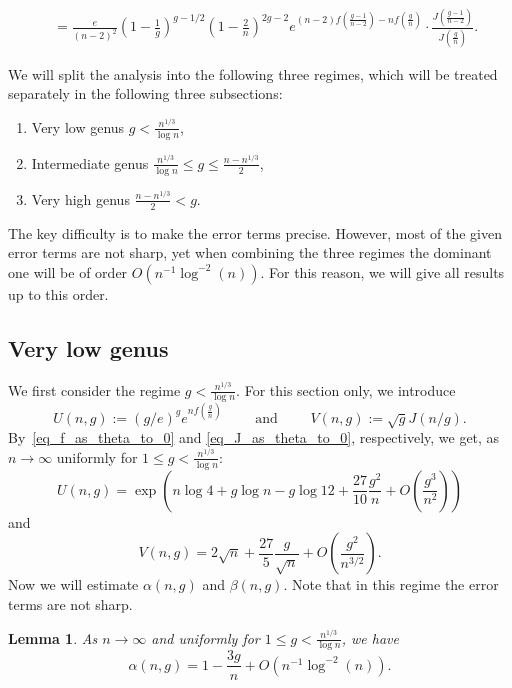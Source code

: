 \documentclass[a4paper,12pt]{article}
\newtheorem{lemma}[theorem]{Lemma}
\theoremstyle{definition}
\newcommand{\nto}{\ensuremath{n\rightarrow\infty}}
\newcommand{\bigO}[1]{O\left({#1}\right)}
\newcommand{\err}{\bigO{n^{-1}\log^{-2}(n)}}
\newcommand{\bigpar}[1]{\left({#1}\right)}
\begin{document}
\begin{align}
        &=  \frac{e}{(n-2)^2}
            \left(1-\frac{1}{g}\right)^{g-1/2}
            \left(1-\frac{2}{n}\right)^{2g-2}
            e^{(n-2)f(\frac{g-1}{n-2})-nf(\frac{g}{n})}  
            \cdot \frac{{J}\left(\frac{g-1}{n-2}\right)}{{J}\left(\frac{g}{n}\right)}. \label{eq:Omega_beta_quot}
\end{align}



We will split the analysis into the following three regimes, which will be treated separately in the following three subsections:
\begin{enumerate}
    \item Very low genus $g<\frac{n^{1/3}}{\log n}$,
    \item Intermediate genus $\frac{n^{1/3}}{\log n}\leq g\leq \frac{n-n^{1/3}}{2}$,
    \item Very high genus $\frac{n-n^{1/3}}{2} < g$.
\end{enumerate}
The key difficulty is to make the error terms precise. 
However, most of the given error terms are not sharp, yet when combining the three regimes the dominant one will be of order $\err$. For this reason, we will give all results up to this order.



\subsection{Very low genus}
We first consider the regime $g<\frac{n^{1/3}}{\log n}$. 
%
For this section only, we introduce
\[U(n,g):=(g/e)^ge^{nf(\frac{g}{n})} \qquad \text{ and } \qquad V(n,g):=\sqrt{g}J(n/g).\]
By~\eqref{eq_f_as_theta_to_0} and \eqref{eq_J_as_theta_to_0}, respectively, we get, as $\nto$ uniformly for $1\leq g<\frac{n^{1/3}}{\log n}$:
\begin{equation}\label{eq_U_low}
    U(n,g)=\exp\bigpar{n\log4+g\log n-g\log12+\frac{27}{10}\frac{g^2}{n}+\bigO{\frac{g^3}{n^2}}}
\end{equation}
and
\begin{equation}\label{eq_V_low}
    V(n,g)= 2\sqrt{n}+\frac{27}{5}\frac{g}{\sqrt{n}}+\bigO{\frac{g^2}{n^{3/2}}}.
\end{equation}
Now we will estimate $\alpha(n,g)$ and $\beta(n,g)$.
Note that in this regime the error terms are not sharp.
\begin{lemma}
    As $n\to\infty$ and uniformly for $1\leq g<\frac{n^{1/3}}{\log n}$, we have
    \[\alpha(n,g)=1-\frac{3g}{n}+\err.\]
\end{lemma}
\end{document}
